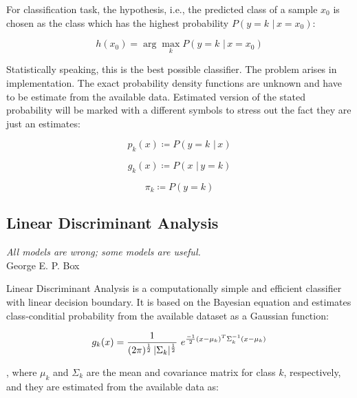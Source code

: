 \documentclass{article}
\newcommand{\argmax}{\arg\!\max} %
\begin{document}
For classification task, the hypothesis, i.e., the predicted class of a sample $x_0$ is chosen as the class which has the highest probability $P(y=k \,\, | \, x=x_0)$:

\begin{equation} 
h(x_0) = \argmax_k P(y=k \,\, | \, x=x_0)
\end{equation}

Statistically speaking, this is the best possible classifier. The problem arises in implementation. The exact probability density functions are unknown and have to be estimate from the available data.
Estimated version of the stated probability will be marked with a different symbols to stress out the fact they are just an estimates:

\begin{equation} 
p_k(x) \coloneqq P(y=k \,\, | \, x)
\end{equation}

\begin{equation} 
g_k(x) \coloneqq P(x  \,\, | \, y=k)
\end{equation}

\begin{equation} 
\pi_k \coloneqq P(y=k)
\end{equation}


\subsection{Linear Discriminant Analysis}

\begin{flushright}
\textit{All models are wrong; some models are useful.} \\George E. P. Box
\end{flushright}

Linear Discriminant Analysis is a computationally simple and efficient classifier with linear decision boundary.
It is based on the Bayesian equation and estimates class-conditial probability from the available dataset as a Gaussian function:

\begin{equation} 
g_k(x) = \frac{1}{(2 \pi)^{\nicefrac{1}{2}}\, |\Sigma_k|^{\nicefrac{1}{2}}}\,\, e^{\nicefrac{-1}{2}  (x-\mu_k)^T  \Sigma_k^{-1} (x-\mu_k)} 
\end{equation}

, where $\mu_k$ and $\Sigma_k$ are the mean and covariance matrix for class $k$, respectively, and they are estimated from the available data as:
\end{document}
